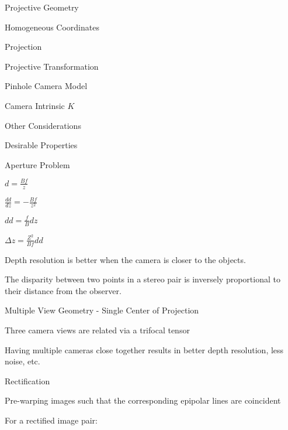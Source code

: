 \begin{section}
\begin{subsubsection}
\begin{subsubsection}
\begin{subsubsection}
\begin{section}{Projective Geometry}
\begin{subsection}{Homogeneous Coordinates}
\begin{subsubsection}
{\begin{subsubsection}{Projection}
\begin{subsubsection}{Projective Transformation}
\begin{subsection}
\begin{subsubsection}
\begin{subsubsection}
\begin{subsubsection}
{\begin{subsubsection}
\begin{subsection}
\begin{subsection} {Pinhole Camera Model}
\begin{subsection} {Camera Intrinsic $K$}
\begin{subsection}
\begin{subsection}
\begin{subsubsection}{Other Considerations}
{\begin{subsection}
\begin{subsubsection}{Desirable Properties}
\begin{section}
\begin{subsection}
\begin{subsection}
\begin{subsection}
\begin{section}
\begin{subsection}
\begin{subsubsection}
\begin{subsubsection}
\begin{subsection}
\begin{section}
\begin{subsection}
\begin{subsubsection}{Aperture Problem}
\begin{subsubsection}
{\begin{section}
\begin{subsubsection}
\begin{subsubsection}
\begin{subsubsection}
\begin{subsection}
\begin{subsection}
\begin{subsection}
\begin{subsection}
\begin{subsection}
\begin{subsection}
\begin{subsection}
{\begin{section}
\begin{subsection}
${d}=\frac{Bf}{z} $

$\frac{dd}{dz}=-\frac{Bf}{z^2}$

$dd = \frac{f}{B}dz$

$\Delta z = \frac{Z^2}{Bf}dd$

Depth resolution is better when the camera is closer to the objects.

The disparity between two points in a stereo pair is inversely proportional to their distance from the observer.

\begin{subsection} Multiple View Geometry - Single Center of Projection

Three camera views are related via a trifocal tensor 

Having multiple cameras close together results in better depth resolution, less noise, etc.

\begin{subsection}Rectification

Pre-warping images such that the corresponding epipolar lines are coincident

For a rectified image pair:


\end{subsection}
\end{subsection}
\end{subsection}
\end{section}}
\end{subsection}
\end{subsection}
\end{subsection}
\end{subsection}
\end{subsection}
\end{subsection}
\end{subsection}
\end{subsubsection}
\end{subsubsection}
\end{subsubsection}
\end{section}}
\end{subsubsection}
\end{subsubsection}
\end{subsection}
\end{section}
\end{subsection}
\end{subsubsection}
\end{subsubsection}
\end{subsection}
\end{section}
\end{subsection}
\end{subsection}
\end{subsection}
\end{section}
\end{subsubsection}
\end{subsection}}
\end{subsubsection}
\end{subsection}
\end{subsection}
\end{subsection}
\end{subsection}
\end{subsection}
\end{subsubsection}}
\end{subsubsection}
\end{subsubsection}
\end{subsubsection}
\end{subsection}
\end{subsubsection}
\end{subsubsection}}
\end{subsubsection}
\end{subsection}
\end{section}
\end{subsubsection}
\end{subsubsection}
\end{subsubsection}
\end{section}
